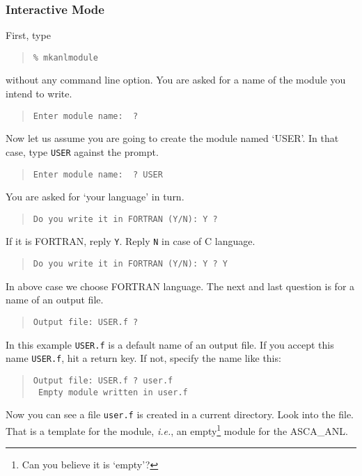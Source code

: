 \subsubsection{Interactive Mode}
First, type
\begin{quote}\baselineskip 3.2mm\begin{verbatim}
% mkanlmodule
\end{verbatim}\end{quote}
without any command line option.
%
You are asked for a name of the module you intend to write.
%
\begin{quote}\baselineskip 3.2mm\begin{verbatim}
Enter module name:  ?
\end{verbatim}\end{quote}
%
Now let us assume you are going to create the module named `USER'.
In that case, type {\tt USER} against the prompt.
%
\begin{quote}\baselineskip 3.2mm\begin{verbatim}
Enter module name:  ? USER
\end{verbatim}\end{quote}
%
You are asked for `your language' in turn.
%
\begin{quote}\baselineskip 3.2mm\begin{verbatim}
Do you write it in FORTRAN (Y/N): Y ?
\end{verbatim}\end{quote}
%
If it is FORTRAN,
reply {\tt Y}.
Reply {\tt N} in case of C language.
%
\begin{quote}\baselineskip 3.2mm\begin{verbatim}
Do you write it in FORTRAN (Y/N): Y ? Y
\end{verbatim}\end{quote}
%
In above case we choose FORTRAN language.
The next and last question is for a name of an output file.
%
\begin{quote}\baselineskip 3.2mm\begin{verbatim}
Output file: USER.f ?
\end{verbatim}\end{quote}
%
In this example
{\tt USER.f} is a default name of an output file.
If you accept this name {\tt USER.f}, hit a return key.
If not, specify the name like this:
%
\begin{quote}\baselineskip 3.2mm\begin{verbatim}
Output file: USER.f ? user.f
 Empty module written in user.f
\end{verbatim}\end{quote}
%
Now you can see a file {\tt user.f} is created in a current directory.
Look into the file.
That is a template for the module,
{\em i.e.},
an empty\footnote{
Can you believe it is `empty'?
} module for the ASCA\_ANL.

